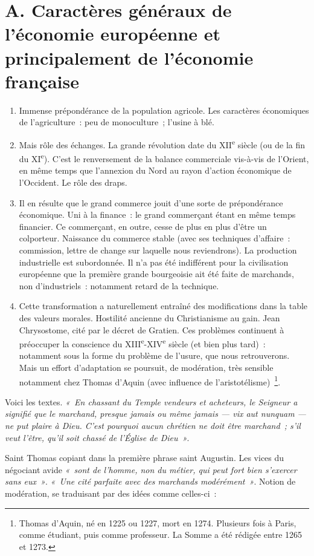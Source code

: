 \documentclass[french,twoside]{book} %
\begin{document}
\section[{A. Caractères généraux de l’économie européenne et principalement de l’économie française}]{A. Caractères généraux de l’économie européenne et principalement de l’économie française}
\label{c09a}
\label{p83}
\begin{enumerate}[itemsep=0pt,]
\item Immense prépondérance de la population agricole. Les caractères économiques de l’agriculture : peu de monoculture ; l’usine à blé.
\item Mais rôle des échanges. La grande révolution date du XII\textsuperscript{e} siècle (ou de la fin du XI\textsuperscript{e}). C’est le renversement de la balance commerciale vis-à-vis de l’Orient, en même temps que l’annexion du Nord au rayon d’action économique de l’Occident. Le rôle des draps.
\item Il en résulte que le grand commerce jouit d’une sorte de prépondérance économique. Uni à la finance : le grand commerçant étant en même temps financier. Ce commerçant, en outre, cesse de plus en plus d’être un colporteur. Naissance du commerce stable (avec ses techniques d’affaire : commission, lettre de change sur laquelle nous reviendrons). La production industrielle est subordonnée. Il n’a pas été indifférent pour la civilisation européenne que la première grande bourgeoisie ait été faite de marchands, non d’industriels : notamment retard de la technique.
\item Cette transformation a naturellement entraîné des modifications dans la table des valeurs morales. Hostilité ancienne du Christianisme au gain. Jean Chrysostome, cité par le décret de Gratien.  
\label{p84} Ces problèmes continuent à préoccuper la conscience du XIII\textsuperscript{e}-XIV\textsuperscript{e} siècle (et bien plus tard) : notamment sous la forme du problème de l’usure, que nous retrouverons. Mais un effort d’adaptation se poursuit, de modération, très sensible notamment chez Thomas d’Aquin (avec influence de l’aristotélisme) \footnote{Thomas d’Aquin, né en 1225 ou 1227, mort en 1274. Plusieurs fois à Paris, comme étudiant, puis comme professeur. La Somme a été rédigée entre 1265 et 1273.}.
\end{enumerate}

\noindent Voici les textes. \emph{« En chassant du Temple vendeurs et acheteurs, le Seigneur a signifié que le marchand, presque jamais ou même jamais — {\itshape vix aut nunquam —} ne put plaire à Dieu. C’est pourquoi aucun chrétien ne doit être marchand ; s’il veut l’être, qu’il soit chassé de l’Église de Dieu »}.\par
Saint Thomas copiant dans la première phrase saint Augustin. Les vices du négociant avide \emph{« sont de l’homme, non du métier, qui peut fort bien s’exercer sans eux »}. \emph{« Une cité parfaite avec des marchands modérément »}. Notion de modération, se traduisant par des idées comme celles-ci :\par
\end{document}
